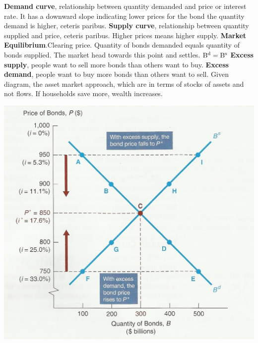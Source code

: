 \documentclass[12pt]{examnotes}
\begin{document}
\textbf{Demand curve}, relationship between quantity demanded and price or interest rate. It has a downward slope indicating lower prices for the bond the quantity demand is higher, ceteris paribus.
\textbf{Supply curve}, relationship between quantity supplied and price, ceteris paribus. Higher prices means higher supply.
\textbf{Market Equilibrium}.Clearing price. Quantity of bonds demanded equals quantity of bonds supplied. The market head towards this point and settles. $\rm{B^d}=\rm{B^s}$
\textbf{Excess supply}, people want to sell more bonds than others want to buy. \textbf{Excess demand}, people want to buy more bonds than others want to sell. 
Given diagram, the asset market approach, which are in terms of stocks of assets and not flows.
If households save more, wealth increases.

\begin{center}
  \includegraphics[scale=0.4]{./imgs/supplydemand.jpg}
\end{center}
\end{document}
